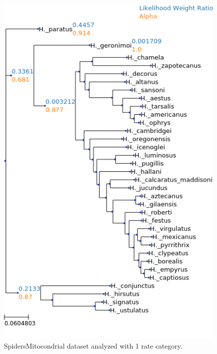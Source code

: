 \documentclass{article}
\begin{document}
\begin{figure}[H]
  \begin{center}
    \includegraphics[width=.75\linewidth]{figs/spiders/1rate.png}
    \caption{SpidersMitocondrial dataset analyzed with 1 rate category.}
    \label{fig:spiders1rate}
  \end{center}
\end{figure}
\end{document}
